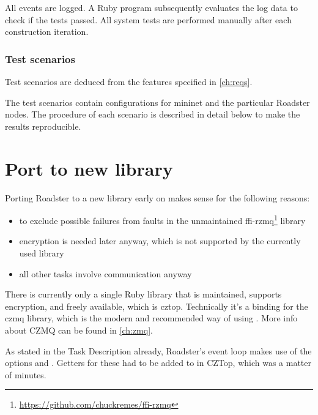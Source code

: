 All events are logged. A Ruby program subsequently evaluates the log data to
check if the tests passed.  All system tests are performed manually after each
construction iteration.

\subsubsection{Test scenarios}
Test scenarios are deduced from the features specified in \autoref{ch:reqs}.

The test scenarios contain configurations for mininet and the particular Roadster nodes.
The procedure of each scenario is described in detail below to make the results reproducible.


\section{Port to new \zmq library}\label{sec:approach:port}
Porting Roadster to a new \zmq library early on makes sense for the following reasons:

\begin{itemize}
\item to exclude possible failures from faults in the unmaintained ffi-rzmq\footnote{\url{https://github.com/chuckremes/ffi-rzmq}} library
\item encryption is needed later anyway, which is not supported by the currently used library
\item all other tasks involve \zmq communication anyway
\end{itemize}

There is currently only a single Ruby library that is maintained, supports
encryption, and freely available, which is \gls{cztop}. Technically it's a
binding for the \gls{czmq} library, which is the modern and recommended way of
using \zmq. More info about CZMQ can be found in \autoref{ch:zmq}.

As stated in the Task Description already, Roadster's event loop makes use of
the \zmq options  and . Getters for these had to be
added to in CZTop, which was a matter of minutes.


